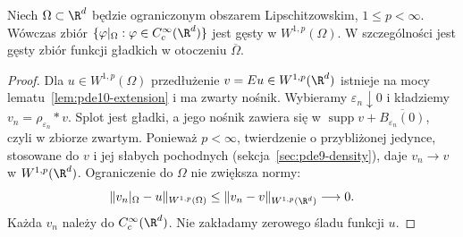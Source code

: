 \begin{wniosek}
\label{cor:pde10-density-boundary}
Niech $\Omega\subset\R^d$ będzie ograniczonym obszarem
Lipschitzowskim, $1\le p<\infty$. Wówczas zbiór
$\{\varphi|_\Omega:\varphi\in C_c^\infty(\R^d)\}$
jest gęsty w $W^{1,p}(\Omega)$. W szczególności jest
gęsty zbiór funkcji gładkich w otoczeniu $\overline\Omega$.
\end{wniosek}
\begin{proof}
Dla $u\in W^{1,p}(\Omega)$ przedłużenie
$v=Eu\in W^{1,p}(\R^d)$ istnieje na mocy
lematu~\ref{lem:pde10-extension} i ma zwarty nośnik.
Wybieramy $\varepsilon_n\downarrow0$ i kładziemy
$v_n=\rho_{\varepsilon_n}*v$. Splot jest gładki,
a jego nośnik zawiera się w
$\operatorname{supp}v+\overline{B_{\varepsilon_n}(0)}$,
czyli w zbiorze zwartym. Ponieważ $p<\infty$,
twierdzenie o przybliżonej jedynce, stosowane do $v$
i jej słabych pochodnych (sekcja~\ref{sec:pde9-density}),
daje $v_n\to v$ w $W^{1,p}(\R^d)$.
Ograniczenie do $\Omega$ nie zwiększa normy:
\[
 \|v_n|_\Omega-u\|_{W^{1,p}(\Omega)}
 \le\|v_n-v\|_{W^{1,p}(\R^d)}\longrightarrow0.
\]
Każda $v_n$ należy do $C_c^\infty(\R^d)$.
Nie zakładamy zerowego śladu funkcji $u$.
\end{proof}

